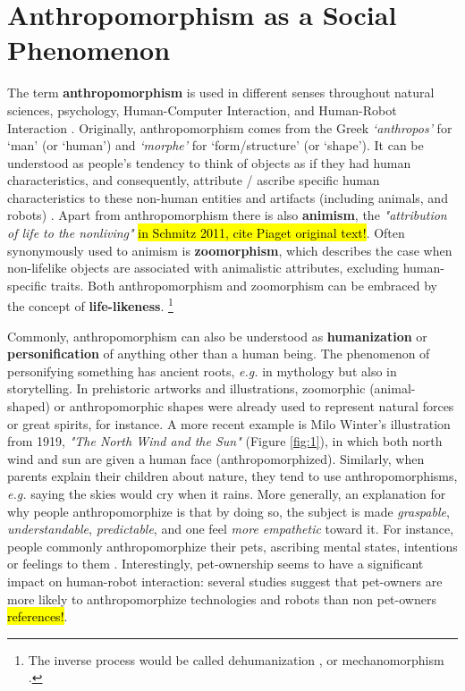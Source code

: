 \documentclass[lettersize, apacite, twoside, HRI]{apa_HRI}
\begin{document}
%
%
%
%
%
%



\section{Anthropomorphism as a Social Phenomenon}
\label{sec:origins-anthropomorphism}

The term \textbf{anthropomorphism} is used in different senses throughout natural sciences, psychology, Human-Computer Interaction, and Human-Robot Interaction \cite{duffy_anthropomorphism_2003}. Originally, anthropomorphism comes from the Greek \textit{`anthropos'} for `man' (or `human') and \textit{`morphe'} for `form/structure' (or `shape'). It can be understood as people's tendency to think of objects as if they had human characteristics, and consequently, attribute / ascribe specific human characteristics to these non-human entities and artifacts (including animals, and robots) \cite{duffy_anthropomorphism_2003,schmitz_concepts_2011}. Apart from anthropomorphism there is also \textbf{animism}, the \textit{"attribution of life to the nonliving"} \hl{in Schmitz 2011, cite Piaget original text!}. Often synonymously used to animism is \textbf{zoomorphism}, which describes the case when non-lifelike objects are associated with animalistic attributes, excluding human-specific traits. Both anthropomorphism and zoomorphism can be embraced by the concept of \textbf{life-likeness}. \footnote{The inverse process would be called dehumanization \cite{haslam_dehumanization:_2006}, or mechanomorphism \cite{caporael_anthropomorphism_1986}.}
		
Commonly, anthropomorphism can also be understood as \textbf{humanization} or \textbf{personification} of anything other than a human being. The phenomenon of personifying something has ancient roots, \textit{e.g.} in mythology but also in storytelling. In prehistoric artworks and illustrations, zoomorphic (animal-shaped) or anthropomorphic shapes were already used to represent natural forces or great spirits, for instance. A more recent example is Milo Winter's illustration from 1919, \textit{"The North Wind and the Sun"} (Figure \ref{fig:1}), in which both north wind and sun are given a human face (anthropomorphized). Similarly, when parents explain their children about nature, they tend to use anthropomorphisms, \textit{e.g.} saying the skies would cry when it rains. More generally, an explanation for why people anthropomorphize is that by doing so, the subject is made \emph{graspable}, \emph{understandable}, \emph{predictable}, and one feel \emph{more empathetic} toward it. For instance, people commonly anthropomorphize their pets, ascribing mental states, intentions or feelings to them \cite{eddy_attribution_1993}. Interestingly, pet-ownership seems to have a significant impact on human-robot interaction: several studies suggest that pet-owners are more likely to anthropomorphize technologies and robots than non pet-owners \hl{references!}.
\end{document}
